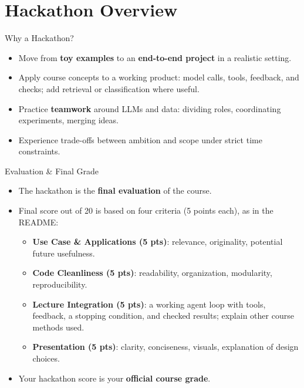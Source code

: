 \documentclass[aspectratio=169]{beamer}
\begin{document}
\section{Hackathon Overview}

\begin{frame}{Why a Hackathon?}
  \begin{itemize}
    \item Move from \textbf{toy examples} to an \textbf{end-to-end project} in a realistic setting.
    \item Apply course concepts to a working product: model calls, tools, feedback, and checks; add retrieval or classification where useful.
    \item Practice \textbf{teamwork} around LLMs and data: dividing roles, coordinating experiments, merging ideas.
    \item Experience trade-offs between ambition and scope under strict time constraints.
  \end{itemize}
\end{frame}

\begin{frame}{Evaluation \& Final Grade}
  \begin{itemize}
    \item The hackathon is the \textbf{final evaluation} of the course.
    \item Final score out of 20 is based on four criteria (5 points each), as in the README:
      \begin{itemize}
        \item \textbf{Use Case \& Applications (5 pts)}: relevance, originality, potential future usefulness.
        \item \textbf{Code Cleanliness (5 pts)}: readability, organization, modularity, reproducibility.
        \item \textbf{Lecture Integration (5 pts)}: a working agent loop with tools, feedback, a stopping condition, and checked results; explain other course methods used.
        \item \textbf{Presentation (5 pts)}: clarity, conciseness, visuals, explanation of design choices.
      \end{itemize}
    \item Your hackathon score is your \textbf{official course grade}.
  \end{itemize}
\end{frame}
\end{document}
